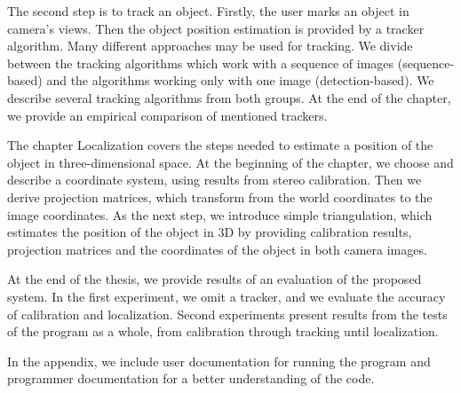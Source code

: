 The second step is to track an object. Firstly, the user marks an object in
camera's views. Then the object position estimation is provided by a tracker
algorithm. Many different approaches may be used for tracking. We divide
between the tracking algorithms which work with a sequence of images
(sequence-based) and the algorithms working only with one image
(detection-based). We describe several tracking algorithms from both groups. At
the end of the chapter, we provide an empirical comparison of mentioned
trackers.

The chapter Localization covers the steps needed to estimate a position of the
object in three-dimensional space. At the beginning of the chapter, we choose
and describe a coordinate system, using results from stereo calibration. Then
we derive projection matrices, which transform from the world coordinates to
the image coordinates. As the next step, we introduce simple triangulation,
which estimates the position of the object in 3D by providing calibration
results, projection matrices and the coordinates of the object in both camera
images.

At the end of the thesis, we provide results of an evaluation of the proposed
system. In the first experiment, we omit a tracker, and we evaluate the
accuracy of calibration and localization. Second experiments present results
from the tests of the program as a whole, from calibration through tracking
until localization.

In the appendix, we include user documentation for running the program and
programmer documentation for a better understanding of the code.
